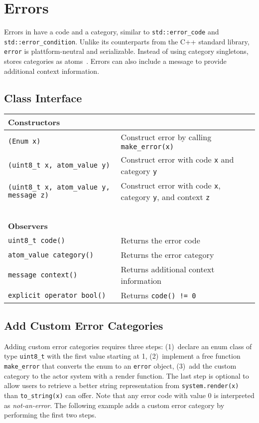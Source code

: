 \section{Errors}
\label{error}

Errors in \lib have a code and a category, similar to \lstinline^std::error_code^ and \lstinline^std::error_condition^. Unlike its counterparts from the C++ standard library, \lstinline^error^ is plattform-neutral and serializable. Instead of using category singletons, \lib stores categories as atoms~. Errors can also include a message to provide additional context information.

\subsection{Class Interface}

{\small
\begin{tabular}{ll}
  \textbf{Constructors} & ~ \\
  \hline
  \lstinline^(Enum x)^ & Construct error by calling \lstinline^make_error(x)^ \\
  \hline
  \lstinline^(uint8_t x, atom_value y)^ & Construct error with code \lstinline^x^ and category \lstinline^y^ \\
  \hline
  \lstinline^(uint8_t x, atom_value y, message z)^ & Construct error with code \lstinline^x^, category \lstinline^y^, and context \lstinline^z^ \\
  \hline
  ~ & ~ \\ \textbf{Observers} & ~ \\
  \hline
  \lstinline^uint8_t code()^ & Returns the error code \\
  \hline
  \lstinline^atom_value category()^ & Returns the error category \\
  \hline
  \lstinline^message context()^ & Returns additional context information \\
  \hline
  \lstinline^explicit operator bool()^ & Returns \lstinline^code() != 0^ \\
  \hline
\end{tabular}
}

\subsection{Add Custom Error Categories}
\label{custom-error}

Adding custom error categories requires three steps: (1)~declare an enum class of type \lstinline^uint8_t^ with the first value starting at 1, (2)~implement a free function \lstinline^make_error^ that converts the enum to an \lstinline^error^ object, (3)~add the custom category to the actor system with a render function. The last step is optional to allow users to retrieve a better string representation from \lstinline^system.render(x)^ than \lstinline^to_string(x)^ can offer. Note that any error code with value 0 is interpreted as \emph{not-an-error}. The following example adds a custom error category by performing the first two steps.

